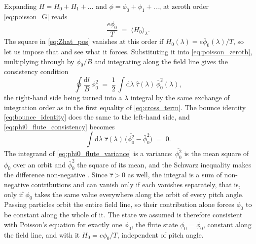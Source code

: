 \documentclass{jpp}
\newcommand{\rmd}{\text{d}}
\newcommand{\lavg}[1]{\langle #1 \rangle_\lambda}
\begin{document}
Expanding $H = H_0 + H_1 + \dots$ and $\phi = \phi_0 + \phi_1 + \dots$, at zeroth order \cref{eq:poisson_G} reads
\begin{equation}\label{eq:poisson_zeroth}
\frac{e\phi_0}{T} \;=\; \lavg{H_0} .
\end{equation}
The square in \cref{eq:Zhat_pos} vanishes at this order if $H_0(\lambda) = e\bar\phi_0(\lambda)/T$, so let us impose that and see what it forces. Substituting it into \cref{eq:poisson_zeroth}, multiplying through by $\phi_0/B$ and integrating along the field line gives the consistency condition
\begin{equation}\label{eq:phi0_flute_consistency}
\oint \frac{\rmd l}{B}\,\phi_0^2 \;=\; \frac{1}{2}\,\int \rmd\lambda\; \hat\tau(\lambda)\,\bar\phi_0^2(\lambda) ,
\end{equation}
the right-hand side being turned into a $\lambda$ integral by the same exchange of integration order as in the first equality of \cref{eq:cross_term}. The bounce identity \cref{eq:bounce_identity} does the same to the left-hand side, and \cref{eq:phi0_flute_consistency} becomes
\begin{equation}\label{eq:phi0_flute_variance}
\int \rmd\lambda\; \hat\tau(\lambda)\,\bigl(\overline{\phi_0^2} - \bar\phi_0^2\bigr) \;=\; 0 .
\end{equation}
The integrand of \cref{eq:phi0_flute_variance} is a variance: $\overline{\phi_0^2}$ is the mean square of $\phi_0$ over an orbit and $\bar\phi_0^2$ the square of its mean, and the Schwarz inequality makes the difference non-negative \citep{Helander2013}. Since $\hat\tau > 0$ as well, the integral is a sum of non-negative contributions and can vanish only if each vanishes separately, that is, only if $\phi_0$ takes the same value everywhere along the orbit of every pitch angle. Passing particles orbit the entire field line, so their contribution alone forces $\phi_0$ to be constant along the whole of it. The state we assumed is therefore consistent with Poisson's equation for exactly one $\phi_0$, the flute state $\phi_0 = \bar\phi_0$, constant along the field line, and with it $H_0 = e\phi_0/T$, independent of pitch angle.
\end{document}
